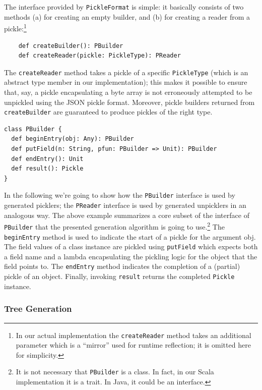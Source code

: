 \documentclass[10pt]{sigplanconf}
\theoremstyle{definition}
\theoremstyle{definition}
\newcommand{\term}[1]{\mbox{\texttt{#1}}}
\begin{document}
The interface provided by \term{PickleFormat} is simple: it basically consists
of two methods (a) for creating an empty builder, and (b) for creating a
reader from a pickle:\footnote{In our actual implementation the
\term{createReader} method takes an additional parameter which is a ``mirror''
used for runtime reflection; it is omitted here for simplicity.}

\begin{lstlisting}
    def createBuilder(): PBuilder
    def createReader(pickle: PickleType): PReader
\end{lstlisting}

The \term{createReader} method takes a pickle of a specific \term{PickleType}
(which is an abstract type member in our implementation); this makes it
possible to ensure that, say, a pickle encapsulating a byte array is not
erroneously attempted to be unpickled using the JSON pickle format. Moreover,
pickle builders returned from \verb|createBuilder| are guaranteed to produce
pickles of the right type.

\begin{lstlisting}
class PBuilder {
  def beginEntry(obj: Any): PBuilder
  def putField(n: String, pfun: PBuilder => Unit): PBuilder
  def endEntry(): Unit
  def result(): Pickle
}
\end{lstlisting}

In the following we're going to show how the \verb|PBuilder| interface is used
by generated picklers; the \verb|PReader| interface is used by generated
unpicklers in an analogous way. The above example summarizes a core
subset of the interface of \verb|PBuilder| that the presented generation
algorithm is going to use.\footnote{It is not necessary that \texttt{PBuilder}
is a class. In fact, in our Scala implementation it is a trait. In Java, it
could be an interface.} The \verb|beginEntry| method is used to indicate the
start of a pickle for the argument obj. The field values of a class instance
are pickled using \verb|putField| which expects both a field name and a lambda
encapsulating the pickling logic for the object that the field points to. The
\verb|endEntry| method indicates the completion of a (partial) pickle of an
object. Finally, invoking \verb|result| returns the completed \verb|Pickle|
instance.

\subsubsection{Tree Generation}
\end{document}
